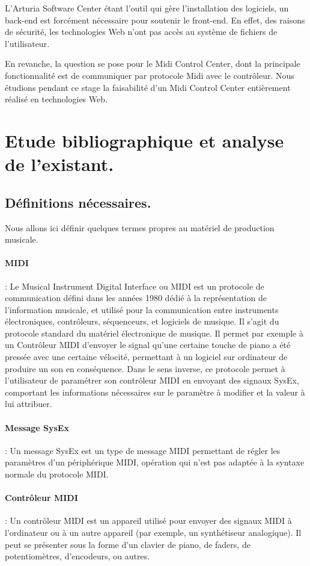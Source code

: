 \documentclass[francais]{rapportPFE}  %
\begin{document}
L'Arturia Software Center étant l'outil qui gère l'installation des logiciels, un back-end est forcément nécessaire pour soutenir le front-end. En effet, des raisons de sécurité, les technologies Web n'ont pas accès au système de fichiers de l'utilisateur.

En revanche, la question se pose pour le Midi Control Center, dont la principale fonctionnalité est de communiquer par protocole Midi avec le contrôleur. Nous étudions pendant ce stage la faisabilité d'un Midi Control Center entièrement réalisé en technologies Web.

\section{Etude bibliographique et analyse de l'existant.}


\subsection{Définitions nécessaires.}

Nous allons ici définir quelques termes propres au matériel de production musicale.
\paragraph{MIDI} \cite{midi}
: Le Musical Instrument Digital Interface ou MIDI est un protocole de communication défini dans les années 1980 dédié à la représentation de l'information musicale, et utilisé pour la communication entre instruments électroniques, contrôleurs, séquenceurs, et logiciels de musique. Il s'agit du protocole standard du matériel électronique de musique. Il permet par exemple à un Contrôleur MIDI d'envoyer le signal qu'une certaine touche de piano a été pressée avec une certaine vélocité, permettant à un logiciel sur ordinateur de produire un son en conséquence. Dans le sens inverse, ce protocole permet à l'utilisateur de paramétrer son contrôleur MIDI en envoyant des signaux SysEx, comportant les informations nécessaires sur le paramètre à modifier et la valeur à lui attribuer.
\paragraph{Message SysEx} \cite{sysex}
: Un message SysEx est un type de message MIDI permettant de régler les paramètres d'un périphérique MIDI, opération qui n'est pas adaptée à la syntaxe normale du protocole MIDI. 
\paragraph{Contrôleur MIDI}  \cite{controller}
:  Un contrôleur MIDI est un appareil utilisé pour envoyer des signaux MIDI à l'ordinateur ou à un autre appareil (par exemple, un synthétiseur analogique). Il peut se présenter sous la forme d'un clavier de piano, de faders, de potentiomètres, d'encodeurs, ou autres.
\end{document}
